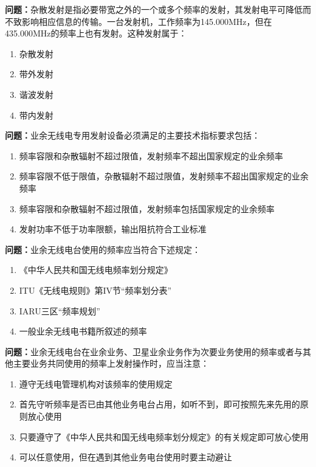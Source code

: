 \bigskip


\noindent\textbf{问题：}杂散发射是指必要带宽之外的一个或多个频率的发射，其发射电平可降低而不致影响相应信息的传输。一台发射机，工作频率为145.000MHz，但在435.000MHz的频率上也有发射。这种发射属于：
\begin{enumerate}[label=\Alph*), leftmargin=3em]
\item 杂散发射
\item 带外发射
\item 谐波发射
\item 带内发射
\end{enumerate}

\bigskip


\noindent\textbf{问题：}业余无线电专用发射设备必须满足的主要技术指标要求包括：
\begin{enumerate}[label=\Alph*), leftmargin=3em]
\item 频率容限和杂散辐射不超过限值，发射频率不超出国家规定的业余频率
\item 频率容限不低于限值，杂散辐射不超过限值，发射频率不超出国家规定的业余频率
\item 频率容限和杂散辐射不超过限值，发射频率包括国家规定的业余频率
\item 发射功率不低于功率限额，输出阻抗符合工业标准
\end{enumerate}

\bigskip


\noindent\textbf{问题：}业余无线电台使用的频率应当符合下述规定：
\begin{enumerate}[label=\Alph*), leftmargin=3em]
\item 《中华人民共和国无线电频率划分规定》
\item ITU《无线电规则》第IV节“频率划分表”
\item IARU三区“频率规划”
\item 一般业余无线电书籍所叙述的频率
\end{enumerate}

\bigskip


\noindent\textbf{问题：}业余无线电台在业余业务、卫星业余业务作为次要业务使用的频率或者与其他主要业务共同使用的频率上发射操作时，应当注意：
\begin{enumerate}[label=\Alph*), leftmargin=3em]
\item 遵守无线电管理机构对该频率的使用规定
\item 首先守听频率是否已由其他业务电台占用，如听不到，即可按照先来先用的原则放心使用
\item 只要遵守了《中华人民共和国无线电频率划分规定》的有关规定即可放心使用
\item 可以任意使用，但在遇到其他业务电台使用时要主动避让
\end{enumerate}

